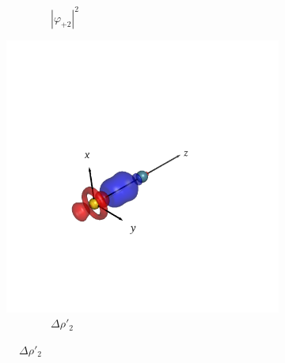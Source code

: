 \documentclass[journal=inoraj,manuscript=article]{achemso}
\begin{document}
\begin{figure}[!h]
\begin{subfigure}[t]{0.32\textwidth}
        \caption*{\ \ \ \ \ \ \ \ $|\varphi_{+2}|^2$}
    \end{subfigure}
    \hfill
    \begin{subfigure}[t]{0.32\textwidth}
        \centering
        \includegraphics[width=\linewidth]{./AuRn+/pair3.png} 
        \caption*{\ \ \ \ \ \ \ \ $\Delta \rho'_2$} 
    \end{subfigure}


\end{figure}
\end{document}

